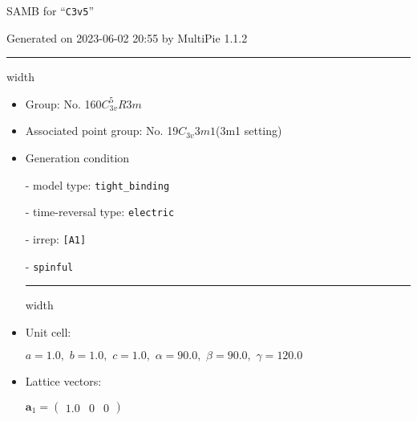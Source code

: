 \documentclass[fleqn,10pt,landscape]{article}
\begin{document}
\setcounter{MaxMatrixCols}{16}

\setlength{\baselineskip}{16pt}
\footnotesize
\begin{center}
\LARGE
SAMB for ``\texttt{C3v5}''
\end{center}
\begin{flushright}
Generated on 2023-06-02 20:55 by MultiPie 1.1.2
\end{flushright}
\vspace{1cm}


 \hfil \hrule height 1mm width \textwidth \hfil

\begin{itemize}
\item Group: No. 160\quad$C_{3v}^{5}$\quad$R3m$\quad[ trigonal ]

\item Associated point group: No. 19\quad$C_{3v}$\quad$3m1$\quad(3m1 setting)\quad[ trigonal ]

\vspace{5mm}

\item Generation condition

\quad - model type: \texttt{tight_binding}

\quad - time-reversal type: \texttt{electric}

\quad - irrep: \texttt{[A1]}

\quad - \texttt{spinful}


 \hfil \hrule height 1mm width \textwidth \hfil

\item Unit cell:

\quad $a=1.0,\,\, b=1.0,\,\, c=1.0,\,\, \alpha=90.0,\,\, \beta=90.0,\,\, \gamma=120.0$

\item Lattice vectors:

\quad $\bm{a}_1=\begin{pmatrix} 1.0 & 0 & 0 \end{pmatrix}$


\end{itemize}
\end{document}
